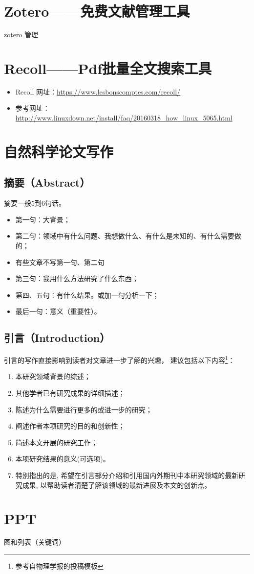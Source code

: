 \section{Zotero——免费文献管理工具}
zotero 管理




\section{Recoll——Pdf批量全文搜索工具}
\begin{itemize}
\item Recoll 网址：\url{https://www.lesbonscomptes.com/recoll/}

\item 参考网址：\url{http://www.linuxdown.net/install/faq/20160318_how_linux_5065.html}
\end{itemize}





\section{自然科学论文写作}
\subsection{摘要（Abstract）}
摘要一般5到6句话。
\begin{itemize}
\item 第一句：大背景；
\item 第二句：领域中有什么问题、我想做什么、有什么是未知的、有什么需要做的；
\item 有些文章不写第一句、第二句
\item 第三句：我用什么方法研究了什么东西；
\item 第四、五句：有什么结果。或加一句分析一下；
\item 最后一句：意义（重要性）。
\end{itemize}


\subsection{引言（Introduction）}
引言的写作直接影响到读者对文章进一步了解的兴趣， 建议包括以下内容\footnote{参考自物理学报的投稿模板}：
\begin{enumerate}
\item 本研究领域背景的综述；
\item 其他学者已有研究成果的详细描述；
\item 陈述为什么需要进行更多的或进一步的研究；
\item 阐述作者本项研究的目的和创新性；
\item 简述本文开展的研究工作；
\item 本项研究结果的意义(可选项)。
\item 特别指出的是, 希望在引言部分介绍和引用国内外期刊中本研究领域的最新研究成果, 以帮助读者清楚了解该领域的最新进展及本文的创新点。
\end{enumerate}



\section{PPT}
图和列表（关键词）













